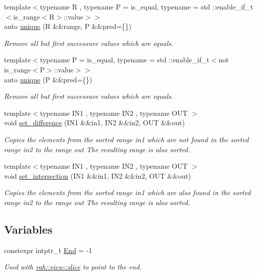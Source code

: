 \begin{DoxyCompactItemize}
{\footnotesize template$<$typename R , typename P  = is\+\_\+equal, typename  = std \+::enable\+\_\+if\+\_\+t$<$is\+\_\+range$<$\+R$>$\+::value$>$$>$ }\\auto \mbox{\hyperlink{namespacerah_a7c4f0afb068c908600b357e111148df7}{unique}} (R \&\&range, P \&\&pred=\{\})
\begin{DoxyCompactList}\small\item\em Remove all but first successuve values which are equals. \end{DoxyCompactList}\item 
{\footnotesize template$<$typename P  = is\+\_\+equal, typename  = std \+::enable\+\_\+if\+\_\+t$<$not is\+\_\+range$<$\+P$>$\+::value$>$$>$ }\\auto \mbox{\hyperlink{namespacerah_aafbbb6f9bd014675985d33d93221acca}{unique}} (P \&\&pred=\{\})
\begin{DoxyCompactList}\small\item\em Remove all but first successuve values which are equals. \end{DoxyCompactList}\item 
{\footnotesize template$<$typename I\+N1 , typename I\+N2 , typename O\+UT $>$ }\\void \mbox{\hyperlink{namespacerah_aca8dbcc943f7c503acea5f58f231a5af}{set\+\_\+difference}} (I\+N1 \&\&in1, I\+N2 \&\&in2, O\+UT \&\&out)
\begin{DoxyCompactList}\small\item\em Copies the elements from the sorted range in1 which are not found in the sorted range in2 to the range out The resulting range is also sorted. \end{DoxyCompactList}\item 
{\footnotesize template$<$typename I\+N1 , typename I\+N2 , typename O\+UT $>$ }\\void \mbox{\hyperlink{namespacerah_a41cb09a0285e2a6814b8aa99f90ba987}{set\+\_\+intersection}} (I\+N1 \&\&in1, I\+N2 \&\&in2, O\+UT \&\&out)
\begin{DoxyCompactList}\small\item\em Copies the elements from the sorted range in1 which are also found in the sorted range in2 to the range out The resulting range is also sorted. \end{DoxyCompactList}\end{DoxyCompactItemize}
\subsection*{Variables}
\begin{DoxyCompactItemize}
\item 
constexpr intptr\+\_\+t \mbox{\hyperlink{namespacerah_a5af06eebbd592c36368022990839b982}{End}} = -\/1
\begin{DoxyCompactList}\small\item\em Used with \mbox{\hyperlink{namespacerah_1_1view_a26e48a024bda08769061de4ad6addd9c}{rah\+::view\+::slice}} to point to the end. \end{DoxyCompactList}\end{DoxyCompactItemize}


